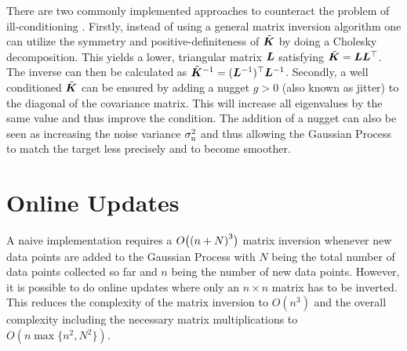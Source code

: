 There are two commonly implemented approaches to counteract the problem of 
ill-conditioning \parencite[cp.][]{Sacks:1989cv, Neal:1997tj, Booker:1999wz, 
    Gramacy:2008es}. Firstly, instead of using a general matrix inversion 
algorithm one can utilize the symmetry and positive-definiteness of 
$\tilde{\bm{K}}$ by doing a Cholesky decomposition. This yields a lower, 
triangular matrix $\bm{L}$ satisfying $\tilde{\bm{K}} = \bm{L}\bm{L}^{\top}$. The 
inverse can then be calculated as $\tilde{\bm{K}}^{-1} = (\bm{L}^{-1})^{\top} \bm{L}^{-1}$.  Secondly, a well conditioned $\tilde{\bm{K}}$ can be ensured by adding 
a nugget $g > 0$ (also known as jitter) to the diagonal of the covariance 
matrix. This will increase all eigenvalues by the same value and thus improve 
the condition.  The addition of a nugget can also be seen as increasing the 
noise variance $\sigma_{\mathrm{n}}^2$ and thus allowing the Gaussian Process to match 
the target less precisely and to become smoother.

\section{Online Updates}\label{sec:onlineup}
A naive implementation requires a $O\!\del[1]{\del[0]{n + N}^3}$ matrix 
inversion whenever new data points are added to the Gaussian Process with $N$ 
being the total number of data points collected so far and $n$ being the number 
of new data points.  However, it is possible to do online updates where only an 
$n \times n$ matrix has to be inverted.  This reduces the complexity of the 
matrix inversion to $O(n^3)$ and the overall complexity including the necessary 
matrix multiplications to $O(n \max\{n^2, N^2\})$.

